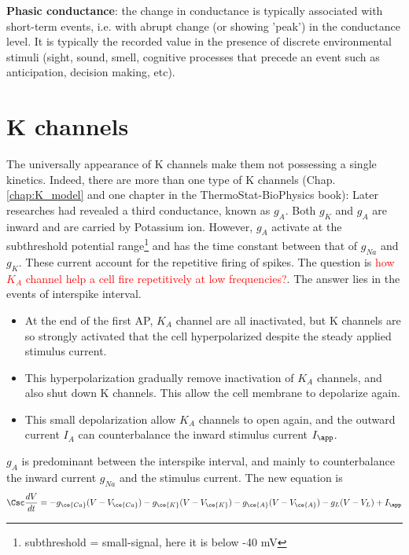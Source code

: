 {\bf Phasic conductance}: the change in conductance is typically associated with
short-term events, i.e. with abrupt change (or showing 'peak') in the
conductance level.
It is typically the recorded value in the presence of discrete environmental
stimuli (sight, sound, smell, cognitive processes that precede an event such as
anticipation, decision making, etc).


\section{K channels}

The universally appearance of K channels make them not possessing a
single kinetics. Indeed, there are more than one type of K channels
(Chap.\ref{chap:K_model} and one chapter in the ThermoStat-BioPhysics book):
Later researches had revealed a third conductance, known as
$g_A$. Both $g_K$ and $g_A$ are inward and are carried by Potassium
ion. However, $g_A$ activate at the subthreshold potential
range\footnote{subthreshold = small-signal, here it is below -40 mV}
and has the time constant between that of $g_{Na}$ and
$g_K$\citep{connor1971prf}. These current account for the repetitive
firing of spikes.  The question is
\textcolor{red}{how $K_A$ channel help a cell fire repetitively at low
  frequencies?}. The answer lies in the events of interspike interval.
\begin{itemize}
\item At the end of the first AP, $K_A$ channel are all inactivated,
  but K channels are so strongly activated that the cell
  hyperpolarized despite the steady applied stimulus current.
\item This hyperpolarization gradually remove inactivation of $K_A$
  channels, and also shut down K channels. This allow the cell
  membrane to depolarize again.
\item This small depolarization allow $K_A$ channels to open again,
  and the outward current $I_A$ can counterbalance the inward stimulus
  current $I_\app$.
\end{itemize}

$g_A$ is predominant between the interspike interval, and mainly to
counterbalance the inward current $g_{Na}$ and the stimulus current. The
new equation is
\begin{equation}
  \label{eq:546}
      \Csc\frac{dV}{dt} = -g_{\ce{Ca}} (V-V_{\ce{Ca}}) - g_{\ce{K}}  (V -
  V_{\ce{K}}) - g_{\ce{A}}(V-V_{\ce{A}}) - g_L (V - V_L) + I_\app
\end{equation}

